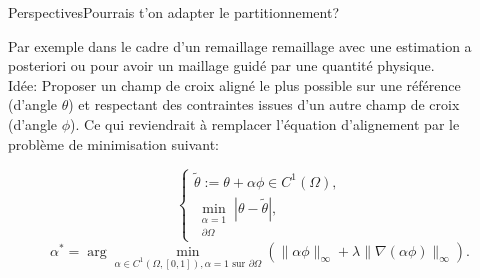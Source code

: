 \documentclass[compress,10pt,aspectratio=169]{beamer}
\begin{document}
\begin{frame}{Perspectives}{Pourrais t'on adapter le partitionnement?}

\small
Par exemple dans le cadre d'un remaillage remaillage avec une estimation a posteriori ou pour avoir un maillage guidé par une quantité physique.\\\vspace{0.3cm}
Idée: Proposer un champ de croix aligné le plus possible sur une référence (d’angle $\theta$) et respectant des contraintes issues d’un autre champ de croix (d’angle $\phi$). Ce qui reviendrait à remplacer l'équation d'alignement par le problème de minimisation suivant:\\\vspace{0.3cm}

\begin{equation*}
\begin{cases}
    \tilde{\theta} := \theta + \alpha\phi \in C^1(\Omega), \\
    \min_{\substack{\alpha=1 \\ \partial\Omega}} \left\lvert \theta - \tilde{\theta} \right\rvert,
\end{cases}
\end{equation*}
$$
\alpha^* = \arg\min_{\alpha\in C^1(\Omega,[0,1]), \alpha=1 \text{ sur } \partial\Omega} \left( \lVert \alpha\phi \rVert_\infty + \lambda \lVert \nabla (\alpha\phi) \rVert_\infty \right).
$$
\end{frame}
\end{document}
